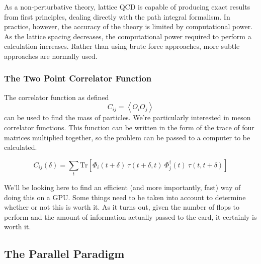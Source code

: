 \documentclass[a4paper,12pt]{report}
\newcommand{\tr}[1]{\textrm{Tr}\left[ #1 \right]}
\begin{document}
As a non-perturbative theory, lattice QCD is capable of producing exact results from first principles, dealing directly with the path integral formalism.
In practice, however, the accuracy of the theory is limited by computational power.
As the lattice spacing decreases, the computational power required to perform a calculation increases.
Rather than using brute force approaches, more subtle approaches are normally used.



\subsubsection{The Two Point Correlator Function}

The correlator function as defined\cite[p~215]{ Lattice_Methods}
%
\begin{equation}
C_{ij} = \left< O_i O_j \right>
\end{equation}
%
can be used to find the mass of particles.
We're particularly interested in meson correlator functions.
This function can be written in the form of the trace of four matrices multiplied together, so the problem can be passed to a computer to be calculated.

\begin{equation}
C_{ij}(\delta) = \sum_t \tr{\Phi_i(t+\delta)\ \tau(t+\delta, t)\ \Phi^\dagger_j(t)\ \tau(t, t+\delta)}
\end{equation}

We'll be looking here to find an efficient (and more importantly, fast) way of doing this on a GPU.
Some things need to be taken into account to determine whether or not this is worth it.
As it turns out, given the number of flops to perform and the amount of information actually passed to the card, it certainly is worth it.











\subsection{The Parallel Paradigm}
\end{document}
